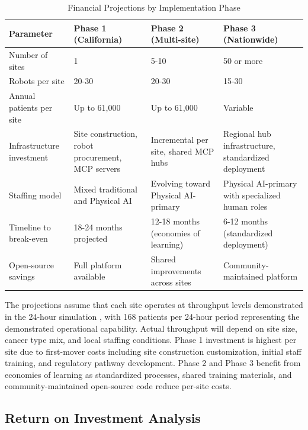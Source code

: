 \begin{table}[H]
\centering
\caption{Financial Projections by Implementation Phase}
\label{tab:financial-projections}
\small
\begin{tabularx}{\textwidth}{l X X X}
\toprule
\textbf{Parameter} & \textbf{Phase 1 (California)} & \textbf{Phase 2 (Multi-site)} & \textbf{Phase 3 (Nationwide)} \\
\midrule
Number of sites & 1 & 5-10 & 50 or more \\
Robots per site & 20-30 & 20-30 & 15-30 \\
Annual patients per site & Up to 61,000 & Up to 61,000 & Variable \\
Infrastructure investment & Site construction, robot procurement, MCP servers & Incremental per site, shared MCP hubs & Regional hub infrastructure, standardized deployment \\
Staffing model & Mixed traditional and Physical AI & Evolving toward Physical AI-primary & Physical AI-primary with specialized human roles \\
Timeline to break-even & 18-24 months projected & 12-18 months (economies of learning) & 6-12 months (standardized deployment) \\
Open-source savings & Full platform available & Shared improvements across sites & Community-maintained platform \\
\bottomrule
\end{tabularx}
\end{table}

The projections assume that each site operates at throughput levels demonstrated
in the 24-hour simulation \cite{site-docs}, with 168 patients per 24-hour
period representing the demonstrated operational capability. Actual throughput
will depend on site size, cancer type mix, and local staffing conditions.
Phase 1 investment is highest per site due to first-mover costs including
site construction customization, initial staff training, and regulatory
pathway development. Phase 2 and Phase 3 benefit from economies of learning
as standardized processes, shared training materials, and community-maintained
open-source code \cite{main-repo, mcp-repo, fl-repo} reduce per-site costs.

\subsection{Return on Investment Analysis}
\label{subsec:financial-roi}

